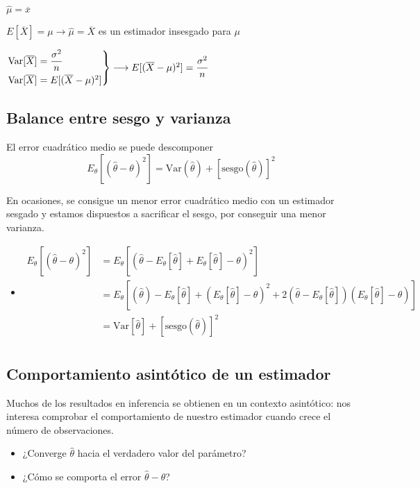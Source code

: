 $\hat{\mu}=\overline{x}$  

$E[\overline{X}]=\mu\longrightarrow \hat{\mu}=\overline{X}$ es un estimador insesgado para $\mu$

$\begin{rcases}
    \mathrm{Var}[\overline{X}]=\dfrac{\sigma^2}{n}\\
    \mathrm{Var}[\overline{X}]=E[(\overline{X}-\mu)^2]
\end{rcases}\longrightarrow E[(\overline{X}-\mu)^2]=\dfrac{\sigma^2}{n} $ 
\subsection{Balance entre sesgo y varianza}
\begin{tcolorbox}[colback=olive!5!white, colframe=olive!75!black, title=\textbf{Sesgo y varianza}]
El error cuadrático medio se puede descomponer \[
    E_\theta[(\hat{\theta}-\theta)^2]=\mathrm{Var}(\hat{\theta})+[\mathrm{sesgo}(\hat{\theta})]^2
\] 
\end{tcolorbox}
En ocasiones, se consigue un menor error cuadrático medio con un estimador sesgado y estamos dispuestos a sacrificar el sesgo, por conseguir una menor varianza.
\begin{itemize}[label=\color{red}\textbullet, leftmargin=*]
    \item {}
        \[
        \begin{aligned}
            E_\theta[(\hat{\theta}-\theta)^2]&= E_\theta[(\hat{\theta}-E_\theta[\hat{\theta}]+E_\theta[\hat{\theta}]-\theta)^2] \\
                                             &= E_\theta[(\hat{\theta})-E_\theta[\hat{\theta}]+(E_\theta[\hat{\theta}]-\theta)^2+2(\hat{\theta}-E_\theta[\hat{\theta}])(E_\theta[\hat{\theta}]-\theta)] \\
                                             &= \mathrm{Var}[\hat{\theta}]+[\mathrm{sesgo}(\hat{\theta})]^2 \\
        \end{aligned}
        \] 

\end{itemize}
\subsection{Comportamiento asintótico de un estimador}
\begin{tcolorbox}[colback=blue!5!white, colframe=blue!75!black, title=\textbf{Cuando el tamaño muestral crece}]
        Muchos de los resultados en inferencia se obtienen en un contexto asintótico: nos interesa comprobar el comportamiento de nuestro estimador cuando crece el número de observaciones.
\end{tcolorbox}
        \begin{itemize}[label=\textbullet]
            \item ¿Converge $\hat{\theta}$ hacia el verdadero valor del parámetro?
            \item ¿Cómo se comporta el error $\hat{\theta}-\theta$?
                
        \end{itemize}

